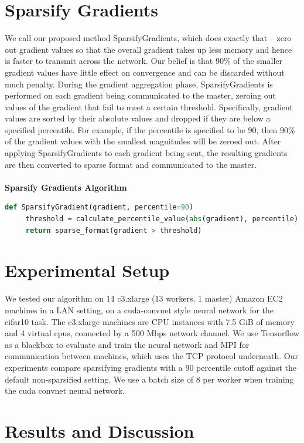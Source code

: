 \documentclass[10pt]{article}
\begin{document}
\section{Sparsify Gradients}
\label{sec-3}

We call our proposed method SparsifyGradients, which does exactly that
-- zero out gradient values so that the overall gradient takes up less
memory and hence is faster to transmit across the network. Our belief
is that 90\% of the smaller gradient
values have little effect on convergence and can be discarded without
much penalty. During the gradient aggregation phase, SparsifyGradients
is performed on each gradient being communicated to the master,
zeroing out values of the gradient that fail to meet a certain threshold.
Specifically, gradient values are sorted by their absolute values and
dropped if they are below a specified percentile. For example, if
the percentile is specified to be 90, then 90\% of the gradient values with the smallest magnitudes
will be zeroed out. After applying SparsifyGradients
to each gradient being sent, the resulting gradients are then
converted to sparse format and communicated to the master.
\\
\\
\textbf{Sparsify Gradients Algorithm}
\begin{lstlisting}[language=Python,frame=lines]
def SparsifyGradient(gradient, percentile=90)
     threshold = calculate_percentile_value(abs(gradient), percentile)
     return sparse_format(gradient > threshold)
\end{lstlisting}

\section{Experimental Setup}
\label{sec-4}
We tested our algorithm on 14 c3.xlarge (13 workers, 1 master) Amazon
EC2 machines in a LAN setting, on a cuda-convnet style neural network
for the cifar10 task. The c3.xlarge machines are CPU instances with
7.5 GiB of memory and 4 virtual cpus, connected by a 500 Mbps network
channel. We use Tensorflow as a blackbox to evaluate and train the
neural network and MPI for communication between machines, which uses
the TCP protocol underneath. Our experiments compare sparsifying
gradients with a 90 percentile cutoff against the default
non-sparsified setting. We use a batch size of 8 per worker when
training the cuda convnet neural network.

\section{Results and Discussion}
\label{sec-5}
\end{document}
